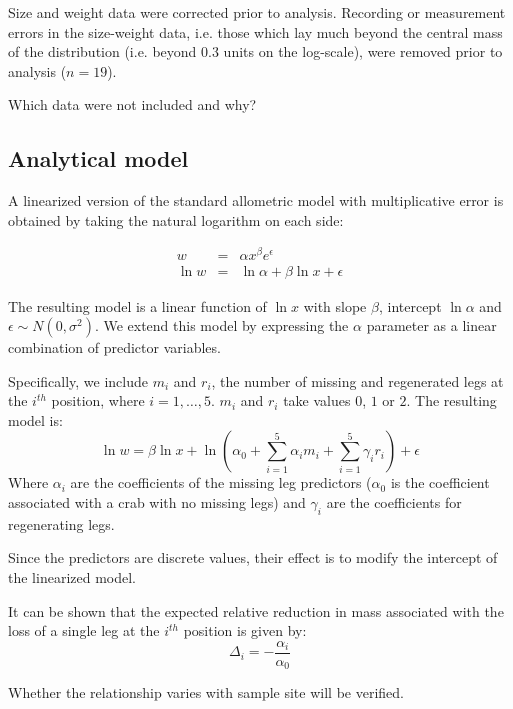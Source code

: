 \documentclass[letterpaper, 10pt]{article}
\begin{document}
Size and weight data were corrected prior to analysis. 
Recording or measurement errors in the size-weight data, i.e. those which lay much beyond the central mass of the distribution (i.e. beyond 0.3 units on the log-scale), were removed prior to analysis ($n=19$). 

Which data were not included and why?

\subsection{Analytical model}

A linearized version of the standard allometric model with multiplicative error is obtained by taking the natural logarithm on each side:

\begin{eqnarray*}
   w &=& \alpha x^\beta e^\epsilon \\
   \ln w &=& \ln \alpha + \beta \ln x + \epsilon
\end{eqnarray*}

The resulting model is a linear function of $\ln x$ with slope $\beta$, intercept $\ln \alpha$ and $\epsilon \sim N(0, \sigma^2)$. We extend this model by expressing the $\alpha$ parameter as a linear combination of predictor variables.

Specifically, we include $m_i$ and $r_i$, the number of missing and regenerated legs at the $i^{th}$ position, where $i = 1, \ldots, 5$. $m_i$ and $r_i$ take values $0$, $1$ or $2$. The resulting model is:
\begin{equation}
   \ln w = \beta \ln x + \ln{\left(\alpha_0 + \sum_{i=1}^{5}{\alpha_i m_i} 
                             + \sum_{i=1}^{5}{\gamma_i r_i}\right)} + \epsilon
\end{equation}
Where $\alpha_i$ are the coefficients of the missing leg predictors ($\alpha_0$ is the coefficient associated with a crab with no missing legs) and $\gamma_i$ are the coefficients for regenerating legs.

Since the predictors are discrete values, their effect is to modify the intercept of the linearized model.

It can be shown that the expected relative reduction in mass associated with the loss of a single leg at the $i^{th}$ position is given by:
\begin{equation}
   \Delta_i = -\frac{\alpha_i}{\alpha_0}
\end{equation}

Whether the relationship varies with sample site will be verified. 
\end{document}
